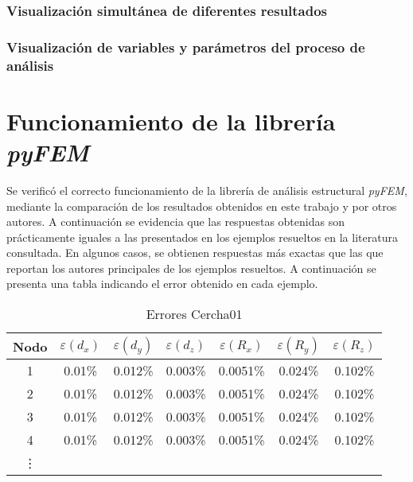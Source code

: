 \subsubsection{Visualización simultánea de diferentes resultados}

\subsubsection{Visualización de variables y parámetros del proceso de análisis}

\section{Funcionamiento de la librería \textit{pyFEM}} \label{sec:libreriaPyFem}

Se verificó el correcto funcionamiento de la librería de análisis estructural \textit{pyFEM}, mediante la comparación de los resultados obtenidos en este trabajo y por otros autores. A continuación se evidencia que las respuestas obtenidas son prácticamente iguales a las presentados en los ejemplos resueltos en la literatura consultada. En algunos casos, se obtienen respuestas más exactas que las que reportan los autores principales de los ejemplos resueltos. A continuación se presenta una tabla indicando el error obtenido en cada ejemplo.

\begin{table}[htbp]
    \centering
    \begin{tabular}{c|ccc|ccc}
        \hline 
        Nodo & $\varepsilon (d_x)$ & $\varepsilon (d_y)$ & $\varepsilon (d_z)$ & $\varepsilon (R_x)$ & $\varepsilon (R_y)$ & $\varepsilon (R_z)$ \\
        \hline 
        1 & 0.01\% & 0.012\% & 0.003\% & 0.0051\% & 0.024\% & 0.102\% \\
        2 & 0.01\% & 0.012\% & 0.003\% & 0.0051\% & 0.024\% & 0.102\% \\
        3 & 0.01\% & 0.012\% & 0.003\% & 0.0051\% & 0.024\% & 0.102\% \\
        4 & 0.01\% & 0.012\% & 0.003\% & 0.0051\% & 0.024\% & 0.102\% \\
        \vdots & & & & & & \\
        \hline 
    \end{tabular}
    \caption{Errores Cercha01}
    \label{tab:errorCercha01}
\end{table}

